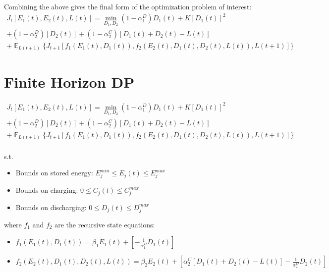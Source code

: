 \documentclass{article}
\DeclareMathOperator{\E}{\mathbb{E}}
\begin{document}
	Combining the above gives the final form of the optimization problem of interest:
	\begin{multline}
	J_{t}[E_{1}(t),E_{2}(t),L(t)] = \min_{D_{1},D_{2}}
	(1-\alpha_{1}^{D})D_{1}(t) 
	+ K[D_{1}(t)]^{2}\\
	+(1-\alpha_{2}^{D})[D_{2}(t)]	  +(1-\alpha_{2}^{C})[D_{1}(t)+D_{2}(t)-L(t)]\\
	+\mathop{\E}_{L(t+1)}\{J_{t+1}[f_{1}(E_{1}(t),D_{1}(t)), f_{2}(E_{2}(t),D_{1}(t),D_{2}(t),L(t)), L(t+1)]\}
	\end{multline}
	
	
	
	\section{Finite Horizon DP}
	\begin{multline} \label{eq:FHDP_eq}
	J_{t}[E_{1}(t),E_{2}(t),L(t)] = \min_{D_{1},D_{2}}
	(1-\alpha_{1}^{D})D_{1}(t) 
	+ K[D_{1}(t)]^{2}\\
	+(1-\alpha_{2}^{D})[D_{2}(t)]	  +(1-\alpha_{2}^{C})[D_{1}(t)+D_{2}(t)-L(t)]\\
	+\mathop{\E}_{L(t+1)}\{J_{t+1}[f_{1}(E_{1}(t),D_{1}(t)), f_{2}(E_{2}(t),D_{1}(t),D_{2}(t),L(t)), L(t+1)]\}
	\end{multline}
	\\
	s.t. 
	\begin{itemize}
		\item Bounds on stored energy: 
		\begin{math}E_{j}^{min}\leq E_{j}(t)\leq E_{j}^{max}\end{math}
		\item Bounds on charging:
		\begin{math}0\leq C_{j}(t)\leq C_{j}^{max}\end{math}
		\item Bounds on discharging:
		\begin{math}0\leq D_{j}(t)\leq D_{j}^{max}\end{math}
	\end{itemize}
	where $f_{1}$ and $f_{2}$ are the recursive state equations:\\
	\begin{itemize}
		\item \begin{math}f_{1}(E_{1}(t),D_{1}(t))=\beta_{1}E_{1}(t)+\left[-\frac{1}{\alpha_{1}^{D}}D_{1}(t)\right]\end{math}\\
		\item \begin{math}f_{2}(E_{2}(t),D_{1}(t),D_{2}(t),L(t))=\beta_{2}E_{2}(t)+\left[\alpha_{2}^{C}[D_{1}(t)+D_{2}(t)-L(t)]-\frac{1}{\alpha_{2}^{D}}D_{2}(t)\right]\end{math}
	\end{itemize}
	
\end{document}
